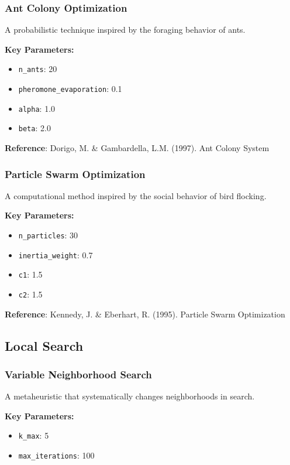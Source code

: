 \documentclass[11pt,a4paper]{article}
\begin{document}
\subsubsection{Ant Colony Optimization}

A probabilistic technique inspired by the foraging behavior of ants.

\textbf{Key Parameters:}
\begin{itemize}
    \item \texttt{n_ants}: 20
    \item \texttt{pheromone_evaporation}: 0.1
    \item \texttt{alpha}: 1.0
    \item \texttt{beta}: 2.0
\end{itemize}

\textbf{Reference}: Dorigo, M. & Gambardella, L.M. (1997). Ant Colony System

\subsubsection{Particle Swarm Optimization}

A computational method inspired by the social behavior of bird flocking.

\textbf{Key Parameters:}
\begin{itemize}
    \item \texttt{n_particles}: 30
    \item \texttt{inertia_weight}: 0.7
    \item \texttt{c1}: 1.5
    \item \texttt{c2}: 1.5
\end{itemize}

\textbf{Reference}: Kennedy, J. & Eberhart, R. (1995). Particle Swarm Optimization

\subsection{Local Search}

\subsubsection{Variable Neighborhood Search}

A metaheuristic that systematically changes neighborhoods in search.

\textbf{Key Parameters:}
\begin{itemize}
    \item \texttt{k_max}: 5
    \item \texttt{max_iterations}: 100
\end{itemize}
\end{document}
